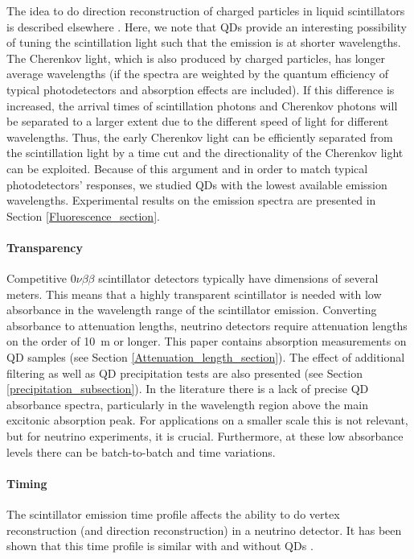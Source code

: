 \documentclass[cits]{JINST}
\begin{document}
The idea to do direction reconstruction of charged particles in liquid scintillators is described elsewhere \cite{mitpaper,simpaper}. Here, we note that QDs provide an interesting possibility of tuning the scintillation light such that the emission is at shorter wavelengths. The Cherenkov light, which is also produced by charged particles, has longer average wavelengths (if the spectra are weighted by the quantum efficiency of typical photodetectors and absorption effects are included). If this difference is increased, the arrival times of scintillation photons and Cherenkov photons will be separated to a larger extent due to the different speed of light for different wavelengths. Thus, the early Cherenkov light can be efficiently separated from the scintillation light by a time cut and the directionality of the Cherenkov light can be exploited. Because of this argument and in order to match typical photodetectors' responses, we studied QDs with the lowest available emission wavelengths. Experimental results on the emission spectra are presented in Section \ref{Fluorescence_section}. 

\paragraph{Transparency}
Competitive 0$\nu\beta\beta$ scintillator detectors typically have dimensions of several meters. This means that a highly transparent scintillator is needed with low absorbance in the wavelength range of the scintillator emission. Converting absorbance to attenuation lengths, neutrino detectors require attenuation lengths on the order of 10~m or longer. This paper contains absorption measurements on QD samples (see Section \ref{Attenuation_length_section}). The effect of additional filtering as well as QD precipitation tests are also presented (see Section \ref{precipitation_subsection}). In the literature there is a lack of precise QD absorbance spectra, particularly in the wavelength region above the main excitonic absorption peak. For applications on a smaller scale this is not relevant, but for neutrino experiments, it is crucial. Furthermore, at these low absorbance levels there can be batch-to-batch and time variations.

\paragraph{Timing}
The scintillator emission time profile affects the ability to do vertex reconstruction (and direction reconstruction) in a neutrino detector. It has been shown that this time profile is similar with and without QDs \cite{mitpaper}. 
\end{document}
